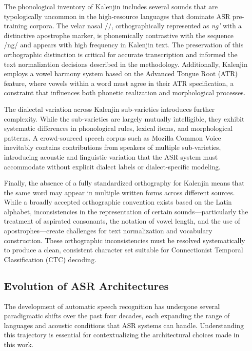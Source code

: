 \documentclass[12pt,a4paper]{article}
\begin{document}
The phonological inventory of Kalenjin includes several sounds that are typologically uncommon in the high-resource languages that dominate ASR pre-training corpora. The velar nasal /\ng/, orthographically represented as \textit{ng'} with a distinctive apostrophe marker, is phonemically contrastive with the sequence /ng/ and appears with high frequency in Kalenjin text. The preservation of this orthographic distinction is critical for accurate transcription and informed the text normalization decisions described in the methodology. Additionally, Kalenjin employs a vowel harmony system based on the Advanced Tongue Root (ATR) feature, where vowels within a word must agree in their ATR specification, a constraint that influences both phonetic realization and morphological processes.

The dialectal variation across Kalenjin sub-varieties introduces further complexity. While the sub-varieties are largely mutually intelligible, they exhibit systematic differences in phonological rules, lexical items, and morphological patterns. A crowd-sourced speech corpus such as Mozilla Common Voice inevitably contains contributions from speakers of multiple sub-varieties, introducing acoustic and linguistic variation that the ASR system must accommodate without explicit dialect labels or dialect-specific modeling.

Finally, the absence of a fully standardized orthography for Kalenjin means that the same word may appear in multiple written forms across different sources. While a broadly accepted orthographic convention exists based on the Latin alphabet, inconsistencies in the representation of certain sounds---particularly the treatment of aspirated consonants, the notation of vowel length, and the use of apostrophes---create challenges for text normalization and vocabulary construction. These orthographic inconsistencies must be resolved systematically to produce a clean, consistent character set suitable for Connectionist Temporal Classification (CTC) decoding.

\subsection{Evolution of ASR Architectures}

The development of automatic speech recognition has undergone several paradigmatic shifts over the past four decades, each expanding the range of languages and acoustic conditions that ASR systems can handle. Understanding this trajectory is essential for contextualizing the architectural choices made in this work.
\end{document}
